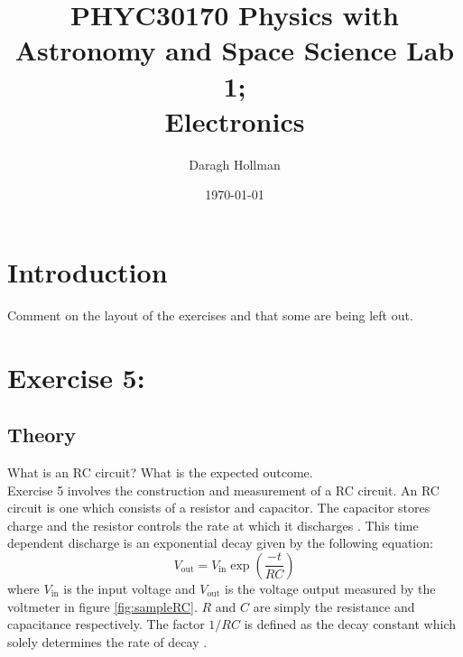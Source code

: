 \documentclass[%
reprint,
amsmath,amssymb,
aps,
floatfix
]{revtex4-2}
\begin{document}
	
	
	\title{PHYC30170 Physics with Astronomy and Space Science Lab 1;\\Electronics}
	
	\author{Daragh Hollman}
	
	\date{\today}
	
	\begin{abstract}
		
	\end{abstract}
	
	\maketitle
	
	\section{Introduction}
		Comment on the layout of the exercises and that some are being left out.
	
	\section{Exercise 5: }
		\subsection{Theory}
		What is an RC circuit? What is the expected outcome.\\
		
		Exercise 5 involves the construction and measurement of a RC circuit. An RC circuit is one which consists of a resistor and capacitor. The capacitor stores charge and the resistor controls the rate at which it discharges \cite{pumplin}. This time dependent discharge is an exponential decay given by the following equation:
		\begin{equation}
			V_\text{out} = V_\text{in} \exp{\left(\frac{-t}{RC}\right)}
			\label{eq:expDecay}
		\end{equation}where $V_\text{in}$ is the input voltage and $V_\text{out}$ is the voltage output measured by the voltmeter in figure \ref{fig:sampleRC}. $R$ and $C$ are simply the resistance and capacitance respectively. The factor $1/RC$ is defined as the decay constant which solely determines the rate of decay \cite{manual}.
		
\end{document}

